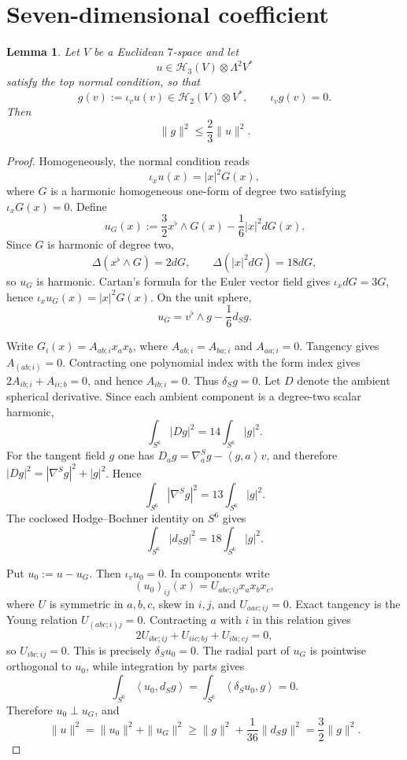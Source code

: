 \documentclass[reqno,11pt]{amsart}
\newtheorem{lemma}[theorem]{Lemma}
\theoremstyle{definition}
\newcommand{\Harm}{\mathscr H}
\newcommand{\inner}[2]{\left\langle #1,#2\right\rangle}
\begin{document}
\section{Seven-dimensional coefficient }\label{app:seven-dimensional-audit}

\begin{lemma}
\label{lem:seven-contraction}
Let $V$ be a Euclidean $7$-space and let
$$
  u\in \Harm_3(V)\otimes\Lambda^2V^*
$$
satisfy the top normal condition, so that
$$
  g(v):=\iota_vu(v)\in\Harm_2(V)\otimes V^*,
  \qquad \iota_vg(v)=0.
$$
Then
\begin{equation*}
  \|g\|^2\leq\frac23\|u\|^2.
\end{equation*}
\end{lemma}

\begin{proof}
Homogeneously, the normal condition reads
$$
  \iota_xu(x)=|x|^2G(x),
$$
where $G$ is a harmonic homogeneous one-form of degree two satisfying
$\iota_xG(x)=0$.  Define
\begin{equation*}
  u_G(x):=\frac32x^\flat\wedge G(x)-\frac16|x|^2dG(x).
\end{equation*}
Since $G$ is harmonic of degree two,
$$
  \Delta(x^\flat\wedge G)=2dG,
  \qquad
  \Delta(|x|^2dG)=18dG,
$$
so $u_G$ is harmonic.  Cartan's formula for the Euler vector field gives
$\iota_xdG=3G$, hence
$\iota_xu_G(x)=|x|^2G(x)$.  On the unit sphere,
\begin{equation*}
  u_G=v^\flat\wedge g-\frac16d_Sg.
\end{equation*}

Write $G_i(x)=A_{ab;i}x_ax_b$, where
$A_{ab;i}=A_{ba;i}$ and $A_{aa;i}=0$.  Tangency gives
$A_{(ab;i)}=0$.  Contracting one polynomial index with the form index gives
$2A_{ib;i}+A_{ii;b}=0$, and hence $A_{ib;i}=0$.  Thus
$\delta_Sg=0$.  Let $D$ denote the ambient spherical derivative.
Since each ambient component is a degree-two scalar harmonic,
$$
 \int_{S^6}|Dg|^2=14\int_{S^6}|g|^2.
$$
For the tangent field $g$ one has
$D_ag=\nabla^S_ag-\inner{g}{a}v$, and therefore
$|Dg|^2=|\nabla^Sg|^2+|g|^2$.  Hence
$$
  \int_{S^6}|\nabla^Sg|^2=13\int_{S^6}|g|^2.
$$
The coclosed Hodge--Bochner identity on $S^6$ gives
$$
  \int_{S^6}|d_Sg|^2=18\int_{S^6}|g|^2.
$$

Put $u_0:=u-u_G$.  Then $\iota_vu_0=0$.  In components write
$$
 (u_0)_{ij}(x)=U_{abc;ij}x_ax_bx_c,
$$
where $U$ is symmetric in $a,b,c$, skew in $i,j$, and
$U_{aac;ij}=0$.  Exact tangency is the Young relation
$U_{(abc;i)j}=0$.  Contracting $a$ with $i$ in this relation gives
$$
  2U_{ibc;ij}+U_{iic;bj}+U_{ibi;cj}=0,
$$
so $U_{ibc;ij}=0$.  This is precisely $\delta_Su_0=0$.  The radial part of
$u_G$ is pointwise orthogonal to $u_0$, while integration by parts gives
$$
  \int_{S^6}\inner{u_0}{d_Sg}
  =\int_{S^6}\inner{\delta_Su_0}g=0.
$$
Therefore $u_0\perp u_G$, and
$$
  \|u\|^2
  =\|u_0\|^2+\|u_G\|^2
  \geq\|g\|^2+\frac1{36}\|d_Sg\|^2
  =\frac32\|g\|^2.
$$
\end{proof}
\end{document}
